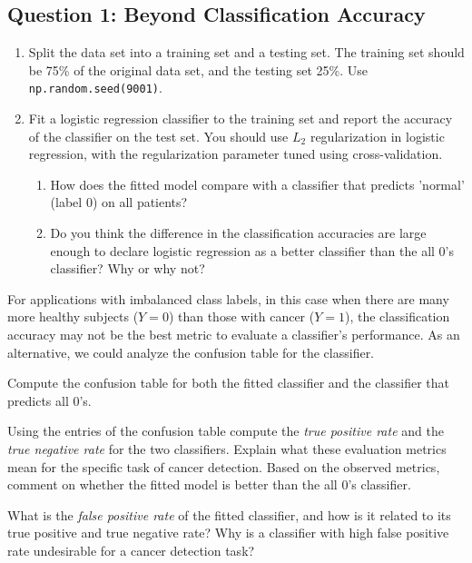 \documentclass[11pt]{article}
\providecommand{\tightlist}{%
      \setlength{\itemsep}{0pt}\setlength{\parskip}{0pt}}
\begin{document}
    \subsection{Question 1: Beyond Classification
Accuracy}\label{question-1-beyond-classification-accuracy}

\begin{enumerate}
\def\labelenumi{\arabic{enumi}.}
\setcounter{enumi}{-1}
\item
  Split the data set into a training set and a testing set. The training
  set should be 75\% of the original data set, and the testing set 25\%.
  Use \texttt{np.random.seed(9001)}.
\item
  Fit a logistic regression classifier to the training set and report
  the accuracy of the classifier on the test set. You should use \(L_2\)
  regularization in logistic regression, with the regularization
  parameter tuned using cross-validation.

  \begin{enumerate}
  \def\labelenumii{\arabic{enumii}.}
  \tightlist
  \item
    How does the fitted model compare with a classifier that predicts
    'normal' (label 0) on all patients?
  \item
    Do you think the difference in the classification accuracies are
    large enough to declare logistic regression as a better classifier
    than the all 0's classifier? Why or why not?
  \end{enumerate}
\end{enumerate}

For applications with imbalanced class labels, in this case when there
are many more healthy subjects (\(Y=0\)) than those with cancer
(\(Y=1\)), the classification accuracy may not be the best metric to
evaluate a classifier's performance. As an alternative, we could analyze
the confusion table for the classifier.

Compute the confusion table for both the fitted classifier and the
classifier that predicts all 0's.

Using the entries of the confusion table compute the \emph{true positive
rate} and the \emph{true negative rate} for the two classifiers. Explain
what these evaluation metrics mean for the specific task of cancer
detection. Based on the observed metrics, comment on whether the fitted
model is better than the all 0's classifier.

What is the \emph{false positive rate} of the fitted classifier, and how
is it related to its true positive and true negative rate? Why is a
classifier with high false positive rate undesirable for a cancer
detection task?
\end{document}
